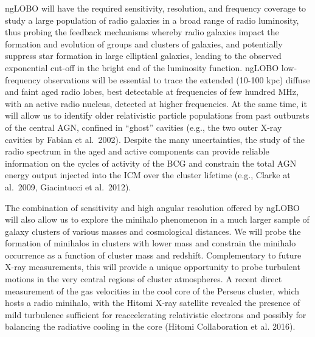 \documentclass[11pt]{article}
\begin{document}
ngLOBO will have the required sensitivity, resolution, and frequency coverage to study a 
large population of radio galaxies in a broad range of radio luminosity, thus probing the feedback 
mechanisms whereby radio galaxies impact the formation and evolution of groups and clusters 
of galaxies, and potentially suppress star formation in large elliptical galaxies, 
leading to the observed exponential cut-off in the bright end of the luminosity function.
ngLOBO low-frequency observations will be essential to trace the extended (10-100 kpc) diffuse 
and faint aged radio lobes, best detectable at frequencies of few hundred MHz, with an 
active radio nucleus, detected at higher frequencies. At the same time, it will allow 
us to identify older relativistic particle populations from past outbursts of the central 
AGN, confined in ``ghost'' cavities (e.g., the two outer X-ray cavities by Fabian et al.\ 2002). 
Despite the many uncertainties, the study of the radio spectrum in the aged and 
active components can provide reliable information on the cycles of activity of the 
BCG and constrain the total AGN energy output injected into the ICM over the cluster 
lifetime (e.g., Clarke at al.\ 2009, Giacintucci et al.\ 2012).

The combination of sensitivity and high angular resolution offered by ngLOBO will also 
allow us to explore the minihalo phenomenon in a much larger sample of galaxy clusters of 
various masses and cosmological distances. We will probe the formation of minihalos in 
clusters with lower mass and constrain the minihalo occurrence as a function of cluster 
mass and redshift. Complementary to future X-ray measurements, this will provide a
unique opportunity to probe turbulent motions in the very central regions of 
cluster atmospheres. A recent direct measurement of the gas velocities in the cool core
of the Perseus cluster, which hosts a radio minihalo, with the Hitomi X-ray satellite 
revealed the presence of mild turbulence sufficient for reaccelerating relativistic 
electrons and possibly for balancing the radiative cooling in the core 
(Hitomi Collaboration et al. 2016). 


\end{document}
